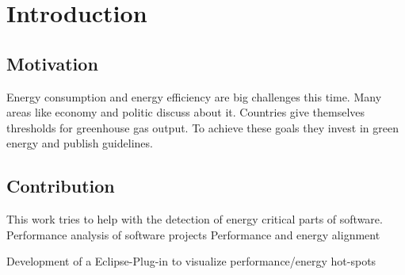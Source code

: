 \chapter{Introduction}
\label{chap:introduction}

\section{Motivation}

Energy consumption and energy efficiency are big challenges this time. Many areas like economy and politic discuss about it. Countries give themselves thresholds for greenhouse gas output. To achieve these goals they invest in green energy and publish guidelines. 


\section{Contribution}

This work tries to help with the detection of energy critical parts of software. 
Performance analysis of software projects 
Performance and energy alignment

Development of a Eclipse-Plug-in to visualize performance/energy hot-spots